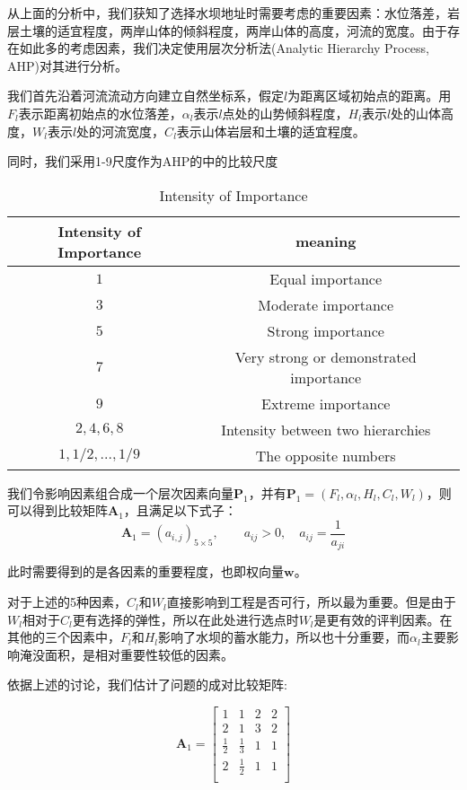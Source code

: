 \documentclass[nocover]{cumcmart}
\begin{document}
从上面的分析中，我们获知了选择水坝地址时需要考虑的重要因素：水位落差，岩层土壤的适宜程度，两岸山体的倾斜程度，两岸山体的高度，河流的宽度。由于存在如此多的考虑因素，我们决定使用层次分析法(Analytic Hierarchy Process, AHP)对其进行分析。

我们首先沿着河流流动方向建立自然坐标系，假定$l$为距离区域初始点的距离。用$F_{l}$表示距离初始点的水位落差，$\alpha_{l}$表示$l$点处的山势倾斜程度，$H_{l}$表示$l$处的山体高度，$W_{l}$表示$l$处的河流宽度，$C_{l}$表示山体岩层和土壤的适宜程度。

同时，我们采用1-9尺度作为AHP的中的比较尺度
\begin{table}[!ht]
\centering
  \begin{tabular}{cc}
  \hline
   Intensity of Importance & meaning  \\
  \hline
  $1$ & Equal importance \\
  $3$ & Moderate importance \\
  $5$ & Strong importance \\
  $7$ & Very strong or demonstrated importance \\
  $9$ & Extreme importance \\
  $2,4,6,8$ & Intensity between two hierarchies \\
  $1,1/2,...,1/9$ & The opposite numbers\\
  \hline
  \end{tabular}
  \caption{Intensity of Importance}
\end{table}

我们令影响因素组合成一个层次因素向量$\textbf{P}_1$，并有$\textbf{P}_1 = (F_{l}, \alpha_{l}, H_{l}, C_{l}, W_{l})$，则可以得到比较矩阵$\textbf{A}_1$，且满足以下式子：
\begin{equation}
\textbf{A}_1 = (a_{i,j})_{5\times5},\qquad a_{ij} > 0, \quad a_{ij} = \frac{1}{a_{ji}}
\end{equation}

此时需要得到的是各因素的重要程度，也即权向量$\textbf{w}$。

对于上述的5种因素，$C_{l}$和$W_{l}$直接影响到工程是否可行，所以最为重要。但是由于$W_{l}$相对于$C_{l}$更有选择的弹性，所以在此处进行选点时$W_{l}$是更有效的评判因素。在其他的三个因素中，$F_{l}$和$H_{l}$影响了水坝的蓄水能力，所以也十分重要，而$\alpha_{l}$主要影响淹没面积，是相对重要性较低的因素。

依据上述的讨论，我们估计了问题的成对比较矩阵:

\[\textbf{A}_1 = 
\left[
\begin{matrix}
1 & 1 & 2 & 2 \\
2 & 1 & 3 & 2 \\ 
\frac{1}{2}& \frac{1}{3} & 1 & 1 \\
2 & \frac{1}{2} & 1 & 1 \\
\end{matrix}
\right]
\]
\end{document}
